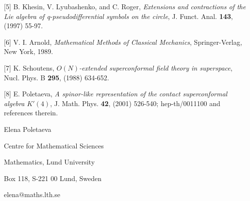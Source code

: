 \documentclass[a4paper,a4paper]{article}
\begin{document}
[5] B. Khesin, V. Lyubashenko, and C. Roger,
{\it Extensions and contractions of the Lie algebra of
q-pseudodifferential symbols on the circle},
J. Funct. Anal. {\bf 143}, (1997) 55-97.

[6]  V. I. Arnold, 
{\it Mathematical Methods of Classical Mechanics},
Springer-Verlag, New York, 1989.

[7] K. Schoutens,
{\it $O(N)$-extended
superconformal field theory in superspace},
Nucl. Phys. B {\bf 295}, (1988) 634-652.

[8] E. Poletaeva,
{\it A spinor-like representation of the contact
superconformal algebra  $K'(4)$}, 
J. Math. Phys. {\bf 42}, (2001) 526-540; hep-th/0011100
and references therein.

\vskip 0.1in

Elena Poletaeva

Centre for Mathematical Sciences

Mathematics, Lund University

Box 118, S-221 00 Lund, Sweden

elena$@$maths.lth.se
\end{document}
